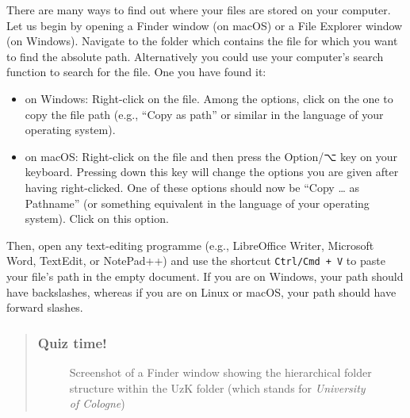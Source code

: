 \documentclass[
  letterpaper,
  DIV=11,
  numbers=noendperiod]{scrreprt}
\begin{document}
There are many ways to find out where your files are stored on your
computer. Let us begin by opening a Finder window (on macOS) or a File
Explorer window (on Windows). Navigate to the folder which contains the
file for which you want to find the absolute path. Alternatively you
could use your computer's search function to search for the file. One
you have found it:

\begin{itemize}
\item
  on Windows: Right-click on the file. Among the options, click on the
  one to copy the file path (e.g., ``Copy as path'' or similar in the
  language of your operating system).
\item
  on macOS: Right-click on the file and then press the Option/⌥ key on
  your keyboard. Pressing down this key will change the options you are
  given after having right-clicked. One of these options should now be
  ``Copy \ldots{} as Pathname'' (or something equivalent in the language
  of your operating system). Click on this option.
\end{itemize}

Then, open any text-editing programme (e.g., LibreOffice Writer,
Microsoft Word, TextEdit, or NotePad++) and use the shortcut
\texttt{Ctrl/Cmd\ +\ V} to paste your file's path in the empty document.
If you are on Windows, your path should have backslashes, whereas if you
are on Linux or macOS, your path should have forward slashes.

\begin{quote}
\subsubsection*{Quiz time!}\label{quiz-time-2}

\begin{figure}


\caption{\label{fig-FinderWindowPath}Screenshot of a Finder window
showing the hierarchical folder structure within the UzK folder (which
stands for \emph{University of Cologne})}

\end{figure}%
\end{quote}
\end{document}
